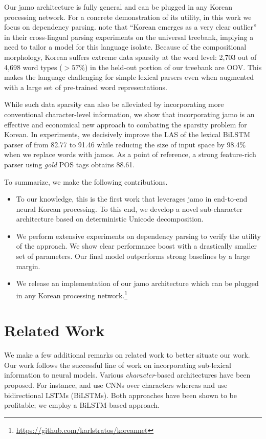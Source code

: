 \documentclass[11pt,letterpaper]{article}
\begin{document}
\begin{CJK}{UTF8}{gbsn}
Our jamo architecture is fully general and can be plugged in any Korean processing network.
For a concrete demonstration of its utility, in this work we focus on dependency parsing.
 note that ``Korean emerges as a very clear outlier'' in their cross-lingual parsing experiments on the universal treebank,
implying a need to tailor a model for this language isolate.
Because of the compositional morphology, Korean suffers extreme data sparsity at the word level:
2,703 out of 4,698 word types ($> 57\%$) in the held-out portion of our treebank are OOV.
This makes the language challenging for simple lexical parsers even when augmented with a large set of pre-trained word representations.

While such data sparsity can also be alleviated by incorporating more conventional character-level information,
we show that incorporating jamo is an effective and economical new approach to combating the sparsity problem for Korean.
In experiments, we decisively improve the LAS of the lexical BiLSTM parser of  from 82.77 to 91.46
while reducing the size of input space by 98.4\% when we replace words with jamos.
As a point of reference, a strong feature-rich parser using \textit{gold} POS tags obtains 88.61.

To summarize, we make the following contributions.
\begin{itemize}
\item To our knowledge, this is the first work that leverages jamo in end-to-end neural Korean processing.
To this end, we develop a novel sub-character architecture based on deterministic Unicode decomposition.
\item We perform extensive experiments on dependency parsing to verify the utility of the approach.
We show clear performance boost with a drastically smaller set of parameters. Our final model outperforms strong baselines by a large margin.
\item We release an implementation of our jamo architecture which can be plugged in any Korean processing network.\footnote{\url{https://github.com/karlstratos/koreannet}}
\end{itemize}

\section{Related Work}
\label{sec:related-work}

We make a few additional remarks on related work to better situate our work.
Our work follows the successful line of work on incorporating sub-lexical information to neural models.
Various \textit{character}-based architectures have been proposed.
For instance,  and  use CNNs over characters whereas
 and  use bidirectional LSTMs (BiLSTMs).
Both approaches have been shown to be profitable; we employ a BiLSTM-based approach.


\end{CJK}
\end{document}
